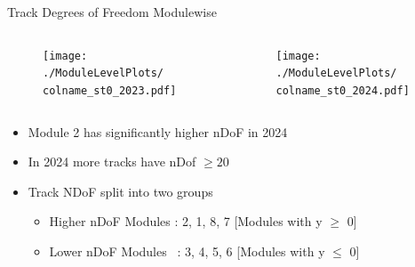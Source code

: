 \begin{frame}{Track Degrees of Freedom Modulewise}
    \newcommand{\colname}{Track_nDoF}
    \begin{columns}
        \begin{column}{0.6\linewidth}
            \begin{figure}
                \centering
                \texttt{[image: ./ModuleLevelPlots/\\colname\_st0\_2023.pdf]}
            \end{figure}
        \end{column}
        \begin{column}{0.6\linewidth}
            \begin{figure}
                \centering
                \texttt{[image: ./ModuleLevelPlots/\\colname\_st0\_2024.pdf]}
            \end{figure}
        \end{column}
    \end{columns}

    \begin{itemize}
        \small
        \item Module 2 has significantly higher nDoF in 2024
        \item In 2024 more tracks have nDof $\geq 20$
        \item Track NDoF split into two groups
        \begin{itemize}
            \item Higher nDoF Modules : 2, 1, 8, 7 [Modules with y $\geq$ 0]
            \item Lower nDoF Modules \ : 3, 4, 5, 6  [Modules with y $\leq$ 0]
        \end{itemize}
    \end{itemize}
\end{frame}

